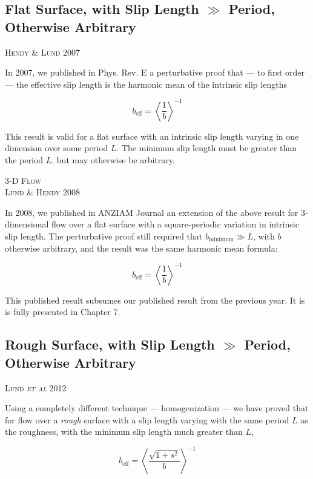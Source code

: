 \documentclass[a4paper]{report}
\newcommand{\beff}{\ensuremath{b_{\mathrm{eff}}}}
\newcommand{\paper}[1]
         {\colorbox[gray]{0.8}{ \textsc{#1}}
         
         }
\begin{document}
\subsection*{Flat Surface, with Slip Length $\gg$ Period, Otherwise Arbitrary}

\paper{Hendy \& Lund 2007}
In 2007, we published in Phys. Rev. E \cite{HendyLund2007} a perturbative proof that --- to first order --- the effective slip length is the harmonic mean of the intrinsic slip lengths

\begin{equation*}
\beff = \left< \frac{1}{b} \right>^{-1}
\end{equation*}

This result is valid for a flat surface with an intrinsic slip length varying in one dimension over some period $L$.  The minimum slip length must be greater than the period $L$, but may otherwise be arbitrary.

\vspace{1em}
\colorbox[gray]{0.8}{ \textsc{3-D Flow} }
\vspace{0.5em} \\

\paper{Lund \& Hendy 2008}
In 2008, we published in ANZIAM Journal \cite{LundHendy2008} an extension of the above result for 3-dimensional flow over a flat surface with a square-periodic variation in intrinsic slip length.  The perturbative proof still required that $b_{\mathrm{minimum}} \gg L$, with $b$ otherwise arbitrary, and the result was the same harmonic mean formula:

\begin{equation*}
\beff = \left< \frac{1}{b} \right>^{-1}
\end{equation*}

This published result subsumes our published result from the previous year.  It is is fully presented in Chapter 7.

\subsection*{Rough Surface, with Slip Length $\gg$ Period, Otherwise Arbitrary}

\paper{Lund \emph{et al} 2012}
Using a completely different technique --- homogenization --- we have proved that
for flow over a \emph{rough} surface with a slip length varying with the same period $L$ as the roughness, with the minimum slip length much greater than $L$,

\begin{equation*}
\beff = \left< \frac{\sqrt{1 + s^2}}{b} \right>^{-1}
\end{equation*}
\end{document}
